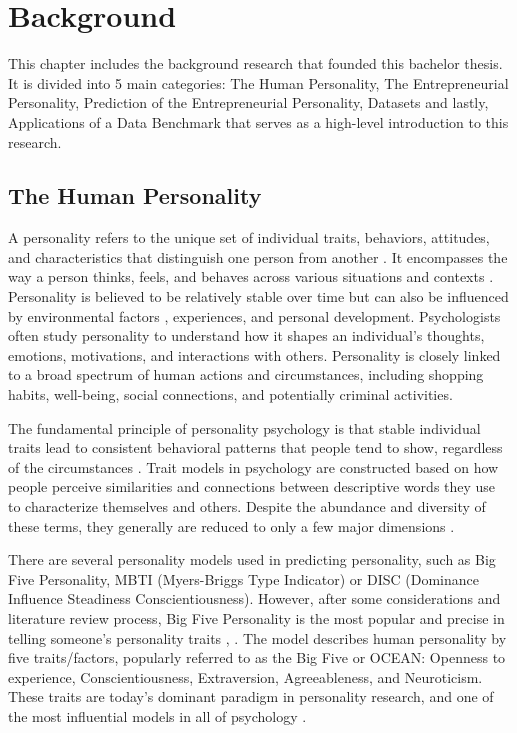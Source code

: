

%

\chapter{Background}
\label{chap:background}

This chapter includes the background research that founded this bachelor thesis. It is divided into 5 main categories: The Human Personality, The Entrepreneurial Personality, Prediction of the Entrepreneurial Personality, Datasets and lastly, Applications of a Data Benchmark that serves as a high-level introduction to this research.

\section{The Human Personality}
A personality refers to the unique set of individual traits, behaviors, attitudes, and characteristics that distinguish one person from another \cite{kerz2022pushing}. It encompasses the way a person thinks, feels, and behaves across various situations and contexts . Personality is believed to be relatively stable over time but can also be influenced by environmental factors \cite{liao2024open}, experiences, and personal development. Psychologists often study personality to understand how it shapes an individual's thoughts, emotions, motivations, and interactions with others. Personality is closely linked to a broad spectrum of human actions and circumstances, including shopping habits, well-being, social connections, and potentially criminal activities.

The fundamental principle of personality psychology is that stable individual traits lead to consistent behavioral patterns that people tend to show, regardless of the circumstances \cite{vinciarelli2014survey}. Trait models in psychology are constructed based on how people perceive similarities and connections between descriptive words they use to characterize themselves and others. Despite the abundance and diversity of these terms, they generally are reduced  to only a few major dimensions  \cite{vinciarelli2014survey}. 

There are several personality models used in predicting personality, such as Big Five Personality, MBTI (Myers-Briggs Type Indicator) or DISC (Dominance Influence Steadiness Conscientiousness). However, after some considerations and literature review process, Big Five Personality is the most popular and precise in telling someone’s personality traits \cite{kerz2022pushing}, \cite{tandera2017personality}. The model describes human personality by five traits/factors, popularly referred to as the Big Five or OCEAN: Openness to experience, Conscientiousness, Extraversion, Agreeableness, and Neuroticism. These traits are today's dominant paradigm in personality research, and one of the most influential models in all of psychology \cite{mccrae2009five}.

